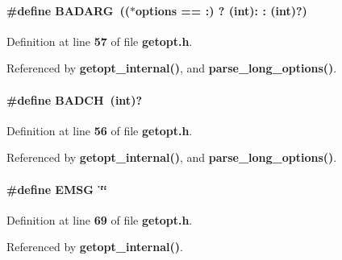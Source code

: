 \paragraph[{B\+A\+D\+A\+RG}]{\setlength{\rightskip}{0pt plus 5cm}\#define B\+A\+D\+A\+RG~(($\ast$options == \textquotesingle{}\+:\textquotesingle{}) ? ({\bf int})\textquotesingle{}\+:\textquotesingle{} \+: ({\bf int})\textquotesingle{}?\textquotesingle{})}\label{soapysdr_2apps_2msvc_2getopt_8h_aa66fa298ed3187720cb609e15cd7d22c}


Definition at line {\bf 57} of file {\bf getopt.\+h}.



Referenced by {\bf getopt\+\_\+internal()}, and {\bf parse\+\_\+long\+\_\+options()}.

\paragraph[{B\+A\+D\+CH}]{\setlength{\rightskip}{0pt plus 5cm}\#define B\+A\+D\+CH~({\bf int})\textquotesingle{}?\textquotesingle{}}\label{soapysdr_2apps_2msvc_2getopt_8h_a1c8c2c090f7416155b04f9d6eb50faa0}


Definition at line {\bf 56} of file {\bf getopt.\+h}.



Referenced by {\bf getopt\+\_\+internal()}, and {\bf parse\+\_\+long\+\_\+options()}.

\paragraph[{E\+M\+SG}]{\setlength{\rightskip}{0pt plus 5cm}\#define E\+M\+SG~\char`\"{}\char`\"{}}\label{soapysdr_2apps_2msvc_2getopt_8h_ac393ec775622430dfe25cd2ac9dec9f4}


Definition at line {\bf 69} of file {\bf getopt.\+h}.



Referenced by {\bf getopt\+\_\+internal()}.

